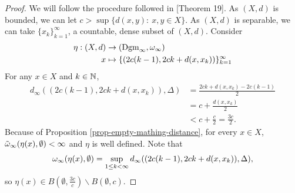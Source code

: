 \begin{proof}
    We will follow the procedure followed in \cite{bubenik}[Theorem 19]. As $ (X, d) $ is bounded, we can let $ c > \sup \{d(x, y): \  x, y \in X\} $. As $ (X, d) $ is separable, we can take $ \{x_k\}_{k=1}^\infty $, a countable, dense subset of $ (X, d) $. Consider
    \begin{align*}
        \eta: (X, d) &\to (\operatorname{Dgm}_\infty, \omega_\infty) \\
        x &\mapsto \{(2c(k-1), 2ck + d(x, x_k))\}_{k=1}^\infty
    \end{align*}
    For any $ x \in X $ and $ k \in \mathbb N$,
    \begin{align*}
        d_\infty((2c(k-1), 2ck + d(x, x_k)), \Delta) 
        &= \frac{2ck + d(x, x_k) - 2c(k-1)}{2} \\
        &= c + \frac{d(x, x_k)}{2} \\
        &< c + \frac{c}{2} = \frac{3c}{2}.
    \end{align*}
    Because of Proposition \ref{prop-empty-mathing-distance}, for every $ x \in X $, $ \tilde \omega_\infty(\eta(x), \emptyset) < \infty $ and $ \eta $ is well defined. Note that
    \begin{align*}
        \omega_\infty(\eta(x), \emptyset) = \sup_{1 \leq k < \infty} d_\infty((2c(k-1), 2ck + d(x, x_k)), \Delta),
    \end{align*}
    so $ \eta(x) \in B(\emptyset, \frac{3c}{c}) \backslash B(\emptyset, c)$.


\end{proof}
